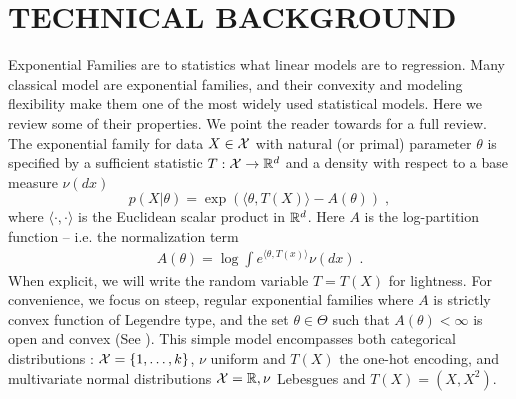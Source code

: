 \documentclass[twoside]{article}
\let\oldsection\section
\renewcommand{\section}[1]{\oldsection{\texorpdfstring{\uppercase{#1}}{#1}}}
\newcommand{\logpart}{A}
\newcommand{\nat}{\theta}
\begin{document}
\section{Technical background}

Exponential Families are to statistics what linear models are to regression.
Many classical model are exponential families, and their convexity and modeling flexibility make them one of the most widely used statistical models.
Here we review some of their properties.
We point the reader towards \citet[Chapter 3]{wainwright2008graphical} for a full review.
The exponential family for data $X\in {\mathcal X}$ with natural (or primal) parameter $\nat$  is specified by a sufficient statistic $T: {\mathcal X} \rightarrow \mathbb{R}^d$ and a density with respect to a base measure $\nu(dx)$
\begin{equation}
	 p(X|\nat) = \exp( \langle \nat, T(X) \rangle - \logpart(\nat)) \; ,
\end{equation}
where $\langle \cdot , \cdot \rangle$ is the Euclidean scalar product in $\mathbb{R}^d$.
Here $\logpart$ is the log-partition function -- i.e. the normalization term
\begin{align}
    \logpart(\nat) = \log \int e^{\langle \nat, T(x) \rangle} \nu(dx) \; .
\end{align}
When explicit, we will write the random variable $T = T(X)$ for lightness.
For convenience, we focus on steep, regular exponential families
where $\logpart$ is strictly convex function of Legendre type,
and the set $\nat \in \Theta$ such that $\logpart(\nat) < \infty$ is open and convex
(See \citet{barndoffnielsen2014information}).
This simple model encompasses both categorical distributions : ${\mathcal X} = \{1, \dots, k\}$, $\nu$ uniform and $T(X)$  the one-hot encoding, and multivariate normal distributions ${\mathcal X}=\mathbb{R}, \nu$ Lebesgues and $T(X)=(X, X^2)$.

\end{document}
